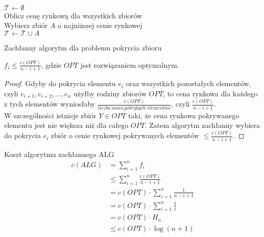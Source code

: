 \begin{algorithm}[H]
  \DontPrintSemicolon
  \\
  \\
  \\
$\mathcal{T} \leftarrow \emptyset$  \\
  {
     Oblicz cenę rynkową dla wszystkich zbiorów\\
     Wybierz zbiór $A$ o najniższej cenie rynkowej\\
     $\mathcal{T} \leftarrow \mathcal{T} \cup A$ 
  }
  \caption{Zachłanny algorytm dla problemu pokrycia zbioru}
  \label{alg-pokrycie}
\end{algorithm}

\begin{lemma}
$f_{i} \leq \frac{c(OPT)}{n-i+1}$, gdzie $OPT$ jest rozwiązaniem optymalnym.\\
\end{lemma}
\begin{proof}
Gdyby do pokrycia elementu $e_i$ oraz wszystkich pozostałych elementów, czyli $e_{i+1}, e_{i+2}, ... , e_{n}$ użyłby rodziny zbiorów $OPT$, to cena rynkowa dla każdego z tych elementów wyniosłaby $\frac{c(OPT)}{liczba \ nowo \ pokrytych \ elementów}$, czyli $\frac{c(OPT)}{n-i+1}$.\\
W szczególności istnieje zbiór $Y \in OPT$ taki, że cena rynkowa pokrywanego elementu jest nie większa niż dla całego $OPT$.
Zatem algorytm zachłanny wybiera do pokrycia $e_i$ zbiór o cenie rynkowej pokrywanych elementów $\leq \frac{c(OPT)}{n-i+1}$.
\end{proof}
Koszt algorytmu zachłannego ALG \\
\begin{align*}
c(ALG) &= \sum_{i=1}^{n} f_i \\ &\leq  
\sum_{i=1}^{n} \frac{c(OPT)}{n-i+1}\\ &= 
c(OPT) \cdot \sum_{i=1}^{n} \frac{1}{n-i+1}\\ &=
 c(OPT) \cdot \sum_{i=1}^{n} \frac{1}{i}\\ &=
  c(OPT) \cdot H_n \\ &\leq c(OPT) \cdot \log(n+1)\\
\end{align*}
